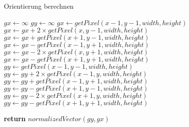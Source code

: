 \begin{algorithm}
	\caption{Orientierung berechnen}
	\label{src:analyseOrientation}
	\begin{algorithmic}[1]
			\State $gx \gets \infty$
			\State $gy \gets \infty$
			\State $gx \gets getPixel(x - 1, y - 1, width, height)$
			\State $gx \gets gx + 2 \times getPixel(x, y - 1, width, height)$
			\State $gx \gets gx + getPixel(x + 1, y - 1, width, height)$
			\State $gx \gets gx - getPixel(x - 1, y + 1, width, height)$
			\State $gx \gets gx - 2 \times getPixel(x, y + 1, width, height)$
			\State $gx \gets gx - getPixel(x + 1, y + 1, width, height)$
			\State $gy \gets getPixel(x - 1, y - 1, width, height)$
			\State $gy \gets gy + 2 \times getPixel(x - 1, y, width, height)$
			\State $gy \gets gy + getPixel(x - 1, y + 1, width, height)$
			\State $gy \gets gy - getPixel(x + 1, y - 1, width, height)$
			\State $gy \gets gy - 2 \times getPixel(x + 1, y, width, height)$
			\State $gy \gets gy - getPixel(x + 1, y + 1, width, height)$
			
			\State \textbf{return} $normalizedVector(gy, gx)$
		\EndProcedure
	\end{algorithmic}
\end{algorithm}
